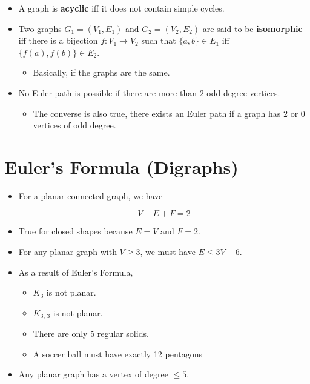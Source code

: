 \documentclass[12pt]{scrartcl}
\begin{document}
\begin{itemize}
    \item A graph is \textbf{acyclic} iff it does not contain simple cycles.
    \item Two graphs $G_1 = (V_1, E_1)$ and $G_2 = (V_2, E_2)$ are said to be \textbf{isomorphic} iff there is a bijection $f: V_1 \rightarrow V_2$ such that $\{a, b\} \in E_1$ iff $\{f(a), f(b)\} \in E_2$.
        \begin{itemize}
            \item Basically, if the graphs are the same.
        \end{itemize}

    \item No Euler path is possible if there are more than $2$ odd degree vertices.
        \begin{itemize}
            \item The converse is also true, there exists an Euler path if a graph has $2$ or $0$ vertices of odd degree.
        \end{itemize}
\end{itemize}


\section{Euler's Formula (Digraphs)}
\begin{itemize}
    \item For a planar connected graph, we have

        \begin{equation*}
            V - E + F = 2
        \end{equation*}

    \item True for closed shapes because $E = V$ and $F = 2$.
    \item For any planar graph with $V \geq 3$, we must have $E \leq 3V - 6$.
    \item As a result of Euler's Formula,
        \begin{itemize}
            \item $K_3$ is not planar.
            \item $K_{3,\, 3}$ is not planar.
            \item There are only 5 regular solids.
            \item A soccer ball must have exactly 12 pentagons
        \end{itemize}

    \item Any planar graph has a vertex of degree $\leq 5$.
\end{itemize}
\end{document}
